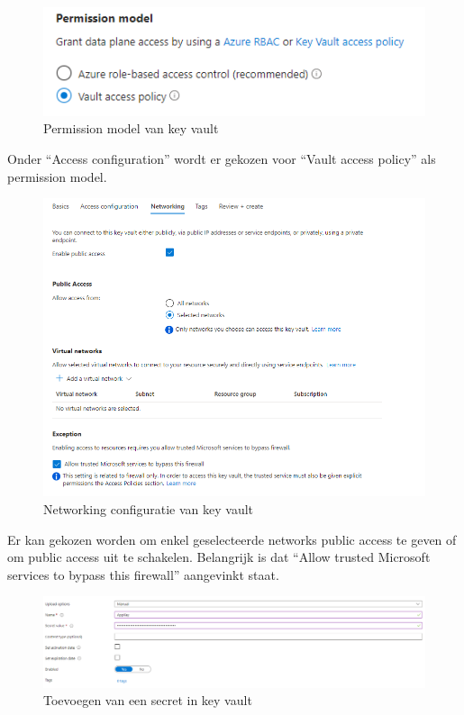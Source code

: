 \begin{figure}[H]
    \centering
    \includegraphics[width=1\textwidth]{./graphics/databricks/connection_9.png}
    \caption{Permission model van key vault}
\end{figure}

Onder ``Access configuration'' wordt er gekozen voor ``Vault access policy'' als permission model.

\begin{figure}[H]
    \centering
    \includegraphics[width=1\textwidth]{./graphics/databricks/connection_10.png}
    \caption{Networking configuratie van key vault}
\end{figure}

Er kan gekozen worden om enkel geselecteerde networks public access te geven of om public access uit te schakelen. Belangrijk is dat ``Allow trusted Microsoft services to bypass this firewall'' aangevinkt staat.

\begin{figure}[H]
    \centering
    \includegraphics[width=1\textwidth]{./graphics/databricks/connection_12.png}
    \caption{Toevoegen van een secret in key vault}
\end{figure}

